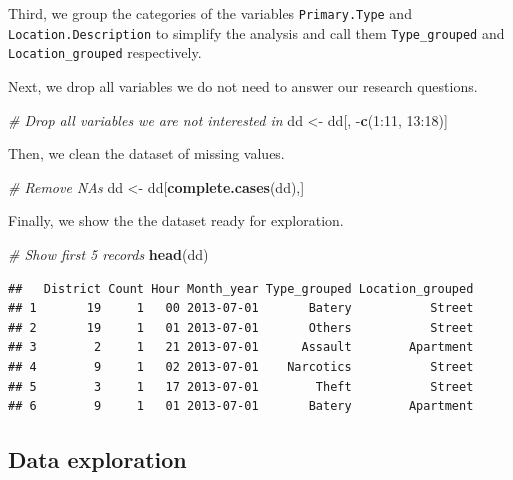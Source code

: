 \documentclass[]{article}
\newenvironment{Shaded}{\begin{snugshade}}{\end{snugshade}}
\newcommand{\KeywordTok}[1]{\textcolor[rgb]{0.13,0.29,0.53}{\textbf{{#1}}}}
\newcommand{\DecValTok}[1]{\textcolor[rgb]{0.00,0.00,0.81}{{#1}}}
\newcommand{\StringTok}[1]{\textcolor[rgb]{0.31,0.60,0.02}{{#1}}}
\newcommand{\CommentTok}[1]{\textcolor[rgb]{0.56,0.35,0.01}{\textit{{#1}}}}
\newcommand{\NormalTok}[1]{{#1}}
\begin{document}
Third, we group the categories of the variables \texttt{Primary.Type}
and \texttt{Location.Description} to simplify the analysis and call them
\texttt{Type\_grouped} and \texttt{Location\_grouped} respectively.

Next, we drop all variables we do not need to answer our research
questions.

\begin{Shaded}
\begin{Highlighting}[]
\CommentTok{# Drop all variables we are not interested in}
\NormalTok{dd <-}\StringTok{ }\NormalTok{dd[, -}\KeywordTok{c}\NormalTok{(}\DecValTok{1}\NormalTok{:}\DecValTok{11}\NormalTok{, }\DecValTok{13}\NormalTok{:}\DecValTok{18}\NormalTok{)]}
\end{Highlighting}
\end{Shaded}

Then, we clean the dataset of missing values.

\begin{Shaded}
\begin{Highlighting}[]
\CommentTok{# Remove NAs}
\NormalTok{dd <-}\StringTok{ }\NormalTok{dd[}\KeywordTok{complete.cases}\NormalTok{(dd),]}
\end{Highlighting}
\end{Shaded}

Finally, we show the the dataset ready for exploration.

\begin{Shaded}
\begin{Highlighting}[]
\CommentTok{# Show first 5 records}
\KeywordTok{head}\NormalTok{(dd)}
\end{Highlighting}
\end{Shaded}

\begin{verbatim}
##   District Count Hour Month_year Type_grouped Location_grouped
## 1       19     1   00 2013-07-01       Batery           Street
## 2       19     1   01 2013-07-01       Others           Street
## 3        2     1   21 2013-07-01      Assault        Apartment
## 4        9     1   02 2013-07-01    Narcotics           Street
## 5        3     1   17 2013-07-01        Theft           Street
## 6        9     1   01 2013-07-01       Batery        Apartment
\end{verbatim}

\subsection{Data exploration}\label{data-exploration}
\end{document}
